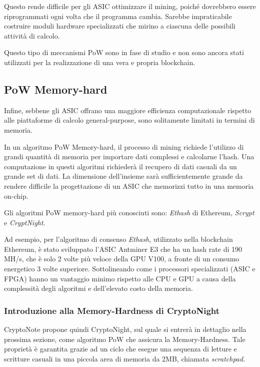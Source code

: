 Questo rende difficile per gli ASIC ottimizzare il mining, poiché dovrebbero essere riprogrammati ogni volta che il programma cambia.
Sarebbe impraticabile costruire moduli hardware specializzati che mirino a ciascuna delle possibili attività di calcolo.  

Questo tipo di meccanismi PoW sono in fase di studio e non sono ancora stati utilizzati per la realizzazione di una vera e propria blockchain.


\subsection{PoW Memory-hard}
Infine, sebbene gli ASIC offrano una maggiore efficienza computazionale rispetto alle piattaforme di calcolo general-purpose, sono solitamente limitati in termini di memoria.
    
In un algoritmo PoW Memory-hard, il processo di mining richiede l'utilizzo di grandi quantità di memoria per importare dati complessi e calcolarne l'hash.
Una computazione in questi algoritmi richiederà il recupero di dati casuali da un grande set di dati. 
La dimensione dell'insieme sarà sufficientemente grande da rendere difficile la progettazione di un ASIC che memorizzi tutto in una memoria on-chip.

Gli algoritmi PoW memory-hard più conosciuti sono: \textit{Ethash} di Ethereum, \textit{Scrypt} e \textit{CryptNight}. 

Ad esempio, per l'algoritmo di consenso \textit{Ethash}, utilizzato nella blockchain Ethereum, 
è stato sviluppato l'ASIC Antminer E3 che ha un hash rate di 190 MH/s, che è solo 2 volte più 
veloce della GPU V100, a fronte di un consumo energetico 3 volte superiore.
Sottolineando come i processori specializzati (ASIC e FPGA) hanno un vantaggio minimo rispetto 
alle CPU e GPU a causa della complessità degli algoritmi e dell'elevato costo della memoria. 




\subsubsection{Introduzione alla Memory-Hardness di CryptoNight}
CryptoNote propone quindi CryptoNight, sul quale si entrerà in dettaglio nella prossima sezione, 
come algoritmo PoW che assicura la Memory-Hardness.
Tale proprietà è garantita grazie ad un ciclo che esegue una sequenza di letture e scritture casuali 
in una piccola area di memoria da 2MB, chiamata \textit{scratchpad}. 

